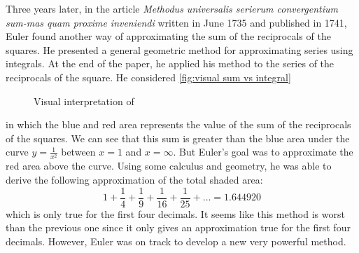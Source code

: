 Three years later, in the article \textit{Methodus universalis serierum convergentium sum-mas quam proxime inveniendi} \cite{eulerE46} written in June 1735 and published in 1741, Euler found another way of approximating the sum of the reciprocals of the squares. He presented a general geometric method for approximating series using integrals. At the end of the paper, he applied his method to the series of the reciprocals of the square. He considered \autoref{fig:visual sum vs integral}
\begin{figure}[h!] 
    \centering
    \caption{Visual interpretation of}
    \label{fig:visual sum vs integral}
\end{figure}
in which the blue and red area represents the value of the sum of the reciprocals of the squares. We can see that this sum is greater than the blue area under the curve $y = \frac{1}{x^2}$ between $x=1$ and $x = \infty$. But Euler's goal was to approximate the red area above the curve. Using some calculus and geometry, he was able to derive the following approximation of the total shaded area:
$$1 + \frac{1}{4} + \frac{1}{9} + \frac{1}{16} + \frac{1}{25} + \dots = 1.644920$$
which is only true for the first four decimals. It seems like this method is worst than the previous one since it only gives an approximation true for the first four decimals. However, Euler was on track to develop a new very powerful method.

